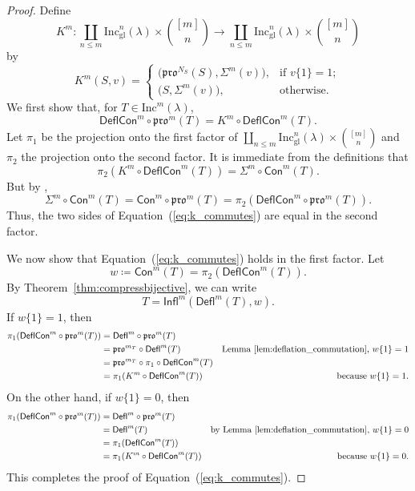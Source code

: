 \documentclass[12pt]{amsart}
\theoremstyle{definition}
\theoremstyle{remark}
\numberwithin{equation}{section}
\newcommand{\inc}{\ensuremath{\mathrm{Inc}}}
\newcommand{\incgl}{\inc_{\mathrm{gl}}}
\newcommand{\pro}{\mathfrak{pro}}
\newcommand{\deflate}{\ensuremath{\mathsf{Defl}}}
\newcommand{\tinflate}{\ensuremath{\mathsf{Infl}}}
\newcommand{\content}{\ensuremath{\mathsf{Con}}}
\newcommand{\compress}{\ensuremath{\mathsf{DeflCon}}}
\begin{document}
  \begin{proof}
Define
  \[
  K^m: \coprod_{n \leq m}\incgl^n(\lambda) \times \binom{[m]}{n} \rightarrow \coprod_{n \leq m}\incgl^n(\lambda) \times \binom{[m]}{n}
  \] by
\[
K^m(S,v) =
\begin{cases}
    \big( \pro^{N_S}(S),\Sigma^m(v) \big),  & \text{if } v\{1\} = 1; \\        
   \big( S,\Sigma^m(v) \big), & \text{otherwise.}
\end{cases}
\]
We first show that, for $T \in \inc^m(\lambda)$,
\begin{equation}\label{eq:k_commutes}
\compress^m \circ \pro^m(T) = K^m \circ \compress^m(T).
\end{equation}
Let $\pi_1$ be the projection onto the first factor of $\coprod_{n \leq m}\incgl^n(\lambda) \times \binom{[m]}{n}$ and $\pi_2$ the projection onto the second factor. It is immediate from the definitions that \[ \pi_2(K^m \circ \compress^m(T)) = \Sigma^m \circ \content^m(T).\] But by \cite[Lemma~2.1]{DPS},
\[  \Sigma^m \circ \content^m(T) = \content^m \circ \pro^m(T) = \pi_2(\compress^m \circ \pro^m(T)).\] Thus, the two sides of Equation~(\ref{eq:k_commutes}) are equal in the second factor.  

We now show that Equation~(\ref{eq:k_commutes}) holds in the first factor. Let \[ w \coloneqq \content^m(T) = \pi_2(\compress^m(T)). \]  By Theorem~\ref{thm:compressbijective}, we can write
\[ T = \tinflate^m(\deflate^m(T), w).\] 
If $w\lbrace 1 \rbrace = 1 $, then
\begin{align*}
\pi_1(\compress^m \circ \pro^m(T)) &= \deflate^m \circ \pro^m(T) \\
&= \pro^{m_T} \circ \deflate^m (T) &\text{Lemma~\ref{lem:deflation_commutation}, $w\lbrace 1 \rbrace = 1$} \\
&= \pro^{m_T} \circ \pi_1 \circ \compress^m(T) \\ 
&= \pi_1(K^m \circ \compress^m(T)) &\text{because $w\lbrace 1 \rbrace = 1$.}
\end{align*}
On the other hand, if $w \lbrace 1 \rbrace = 0$, then 
\begin{align*}
\pi_1(\compress^m \circ \pro^m(T)) &= \deflate^m \circ \pro^m(T) \\
&= \deflate^m(T) &\text{by Lemma~\ref{lem:deflation_commutation}, $w \lbrace 1 \rbrace = 0$} \\
&= \pi_1 ( \compress^m(T) ) \\
&= \pi_1 ( K^m \circ \compress^m(T)) &\text{because $w\lbrace 1 \rbrace = 0$.}
\end{align*}
This completes the proof of Equation~(\ref{eq:k_commutes}).


\end{proof}
\end{document}
